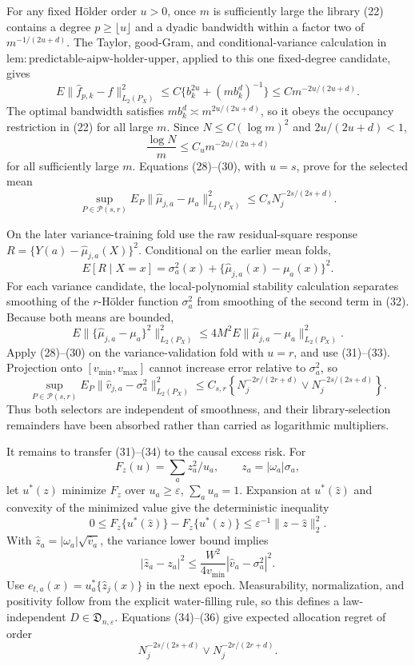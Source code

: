 For any fixed Hölder order \(u>0\), once \(m\) is sufficiently large the library (22) contains a degree \(p\geq\lfloor u\rfloor\) and a dyadic bandwidth within a factor two of \(m^{-1/(2u+d)}\).  The Taylor, good-Gram, and conditional-variance calculation in \(\mathrm{lem{:}predictable\text{-}aipw\text{-}holder\text{-}upper}\), applied to this one fixed-degree candidate, gives
\[
E\|\widehat f_{p,k}-f\|_{L_2(P_X)}^2
\leq C\{b_k^{2u}+(mb_k^d)^{-1}\}
\leq C m^{-2u/(2u+d)}.
\tag{29}
\]
The optimal bandwidth satisfies \(mb_k^d\asymp m^{2u/(2u+d)}\), so it obeys the occupancy restriction in (22) for all large \(m\).  Since \(N\leq C(\log m)^2\) and \(2u/(2u+d)<1\),
\[
\frac{\log N}{m}
\leq C_u m^{-2u/(2u+d)}
\tag{30}
\]
for all sufficiently large \(m\).  Equations (28)--(30), with \(u=s\), prove for the selected mean
\[
\sup_{P\in\mathcal P(s,r)}
E_P\|\widehat\mu_{j,a}-\mu_a\|_{L_2(P_X)}^2
\leq C_sN_j^{-2s/(2s+d)}.
\tag{31}
\]

On the later variance-training fold use the raw residual-square response
\(R=\{Y(a)-\widehat\mu_{j,a}(X)\}^2\).  Conditional on the earlier mean folds,
\[
E[R\mid X=x]
=\sigma_a^2(x)+\{\widehat\mu_{j,a}(x)-\mu_a(x)\}^2.
\tag{32}
\]
For each variance candidate, the local-polynomial stability calculation separates smoothing of the \(r\)-Hölder function \(\sigma_a^2\) from smoothing of the second term in (32).  Because both means are bounded,
\[
E\|\{\widehat\mu_{j,a}-\mu_a\}^2\|_{L_2(P_X)}^2
\leq4M^2E\|\widehat\mu_{j,a}-\mu_a\|_{L_2(P_X)}^2.
\tag{33}
\]
Apply (28)--(30) on the variance-validation fold with \(u=r\), and use (31)--(33).  Projection onto \([v_{\min},v_{\max}]\) cannot increase error relative to \(\sigma_a^2\), so
\[
\sup_{P\in\mathcal P(s,r)}
E_P\|\widehat v_{j,a}-\sigma_a^2\|_{L_2(P_X)}^2
\leq C_{s,r}\left\{
N_j^{-2r/(2r+d)}\vee N_j^{-2s/(2s+d)}
\right\}.
\tag{34}
\]
Thus both selectors are independent of smoothness, and their library-selection remainders have been absorbed rather than carried as logarithmic multipliers.

It remains to transfer (31)--(34) to the causal excess risk.  For
\[
F_z(u)=\sum_a z_a^2/u_a,
\qquad z_a=|\omega_a|\sigma_a,
\]
let \(u^*(z)\) minimize \(F_z\) over \(u_a\geq\varepsilon\), \(\sum_a u_a=1\).  Expansion at \(u^*(\widehat z)\) and convexity of the minimized value give the deterministic inequality
\[
0\leq F_z\{u^*(\widehat z)\}-F_z\{u^*(z)\}
\leq\varepsilon^{-1}\|z-\widehat z\|_2^2.
\tag{35}
\]
With \(\widehat z_a=|\omega_a|\sqrt{\widehat v_a}\), the variance lower bound implies
\[
|\widehat z_a-z_a|^2
\leq\frac{W^2}{4v_{\min}}|\widehat v_a-\sigma_a^2|^2.
\tag{36}
\]
Use \(e_{t,a}(x)=u_a^*\{\widehat z_j(x)\}\) in the next epoch.  Measurability, normalization, and positivity follow from the explicit water-filling rule, so this defines a law-independent \(D\in\mathfrak D_{n,\varepsilon}\).  Equations (34)--(36) give expected allocation regret of order
\[
N_j^{-2s/(2s+d)}\vee N_j^{-2r/(2r+d)}.
\tag{37}
\]

